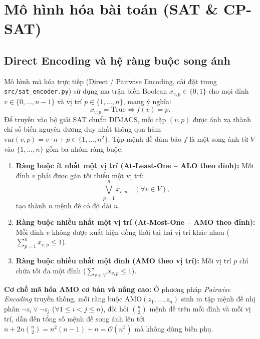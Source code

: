 \documentclass[a4paper,fleqn]{cas-sc}
\begin{document}
\section{Mô hình hóa bài toán (SAT \& CP-SAT)}

\subsection{Direct Encoding và hệ ràng buộc song ánh}
Mô hình mã hóa trực tiếp (Direct / Pairwise Encoding, cài đặt trong \texttt{src/sat\_encoder.py}) sử dụng ma trận biến Boolean $x_{v,p} \in \{0, 1\}$ cho mọi đỉnh $v \in \{0, \dots, n-1\}$ và vị trí $p \in \{1, \dots, n\}$, mang ý nghĩa:
\[
x_{v,p} = \text{True} \iff f(v) = p.
\]
Để truyền vào bộ giải SAT chuẩn DIMACS, mỗi cặp $(v, p)$ được ánh xạ thành chỉ số biến nguyên dương duy nhất thông qua hàm $\text{var}(v, p) = v \cdot n + p \in \{1, \dots, n^2\}$. Tập mệnh đề đảm bảo $f$ là một song ánh từ $V$ vào $\{1, \dots, n\}$ gồm ba nhóm ràng buộc:

\begin{enumerate}
    \item \textbf{Ràng buộc ít nhất một vị trí (At-Least-One -- ALO theo đỉnh):} Mỗi đỉnh $v$ phải được gán tối thiểu một vị trí:
    \[
    \bigvee_{p=1}^{n} x_{v,p} \quad (\forall v \in V),
    \]
    tạo thành $n$ mệnh đề có độ dài $n$.

    \item \textbf{Ràng buộc nhiều nhất một vị trí (At-Most-One -- AMO theo đỉnh):} Mỗi đỉnh $v$ không được xuất hiện đồng thời tại hai vị trí khác nhau ($\sum_{p=1}^{n} x_{v,p} \le 1$).

    \item \textbf{Ràng buộc nhiều nhất một đỉnh (AMO theo vị trí):} Mỗi vị trí $p$ chỉ chứa tối đa một đỉnh ($\sum_{v \in V} x_{v,p} \le 1$).
\end{enumerate}

\noindent\textbf{Cơ chế mã hóa AMO cơ bản và nâng cao:}
Ở phương pháp \textit{Pairwise Encoding} truyền thống, mỗi ràng buộc $\text{AMO}(z_1, \dots, z_n)$ sinh ra tập mệnh đề nhị phân $\neg z_i \lor \neg z_j$ ($\forall 1 \le i < j \le n$), đòi hỏi $\binom{n}{2}$ mệnh đề trên mỗi đỉnh và mỗi vị trí, dẫn đến tổng số mệnh đề song ánh lên tới $n + 2n\binom{n}{2} = n^2(n-1) + n = \mathcal{O}(n^3)$ mà không dùng biến phụ.
\end{document}

